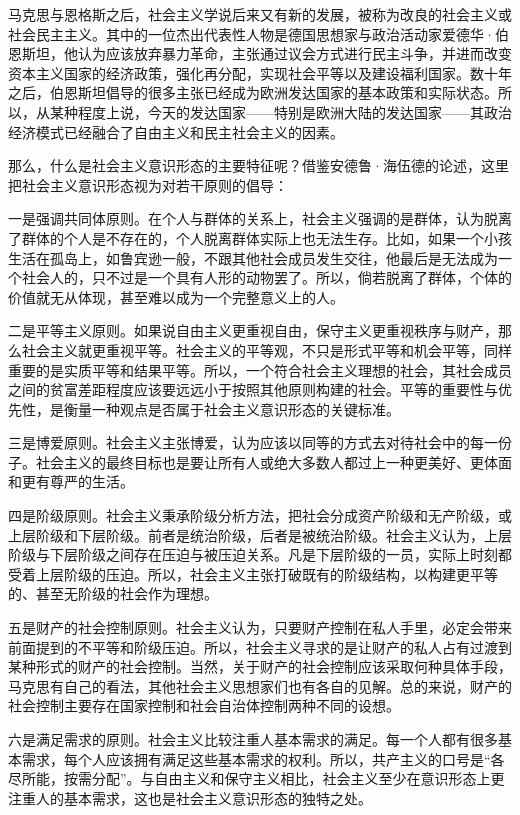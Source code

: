 马克思与恩格斯之后，社会主义学说后来又有新的发展，被称为改良的社会主义或社会民主主义。其中的一位杰出代表性人物是德国思想家与政治活动家爱德华·伯恩斯坦，他认为应该放弃暴力革命，主张通过议会方式进行民主斗争，并进而改变资本主义国家的经济政策，强化再分配，实现社会平等以及建设福利国家。数十年之后，伯恩斯坦倡导的很多主张已经成为欧洲发达国家的基本政策和实际状态。所以，从某种程度上说，今天的发达国家——特别是欧洲大陆的发达国家——其政治经济模式已经融合了自由主义和民主社会主义的因素。

那么，什么是社会主义意识形态的主要特征呢？借鉴安德鲁·海伍德的论述，这里把社会主义意识形态视为对若干原则的倡导：

一是强调共同体原则。在个人与群体的关系上，社会主义强调的是群体，认为脱离了群体的个人是不存在的，个人脱离群体实际上也无法生存。比如，如果一个小孩生活在孤岛上，如鲁宾逊一般，不跟其他社会成员发生交往，他最后是无法成为一个社会人的，只不过是一个具有人形的动物罢了。所以，倘若脱离了群体，个体的价值就无从体现，甚至难以成为一个完整意义上的人。

二是平等主义原则。如果说自由主义更重视自由，保守主义更重视秩序与财产，那么社会主义就更重视平等。社会主义的平等观，不只是形式平等和机会平等，同样重要的是实质平等和结果平等。所以，一个符合社会主义理想的社会，其社会成员之间的贫富差距程度应该要远远小于按照其他原则构建的社会。平等的重要性与优先性，是衡量一种观点是否属于社会主义意识形态的关键标准。

三是博爱原则。社会主义主张博爱，认为应该以同等的方式去对待社会中的每一份子。社会主义的最终目标也是要让所有人或绝大多数人都过上一种更美好、更体面和更有尊严的生活。

四是阶级原则。社会主义秉承阶级分析方法，把社会分成资产阶级和无产阶级，或上层阶级和下层阶级。前者是统治阶级，后者是被统治阶级。社会主义认为，上层阶级与下层阶级之间存在压迫与被压迫关系。凡是下层阶级的一员，实际上时刻都受着上层阶级的压迫。所以，社会主义主张打破既有的阶级结构，以构建更平等的、甚至无阶级的社会作为理想。

五是财产的社会控制原则。社会主义认为，只要财产控制在私人手里，必定会带来前面提到的不平等和阶级压迫。所以，社会主义寻求的是让财产的私人占有过渡到某种形式的财产的社会控制。当然，关于财产的社会控制应该采取何种具体手段，马克思有自己的看法，其他社会主义思想家们也有各自的见解。总的来说，财产的社会控制主要存在国家控制和社会自治体控制两种不同的设想。

六是满足需求的原则。社会主义比较注重人基本需求的满足。每一个人都有很多基本需求，每个人应该拥有满足这些基本需求的权利。所以，共产主义的口号是“各尽所能，按需分配”。与自由主义和保守主义相比，社会主义至少在意识形态上更注重人的基本需求，这也是社会主义意识形态的独特之处。


